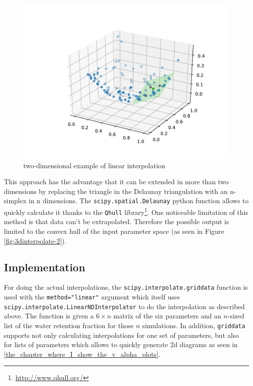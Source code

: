 \begin{figure}[h]
\end{figure}

\begin{figure}[h] %
	\centering
	\includegraphics[width=0.8\linewidth]{images/vis2d3.pdf}
	\caption{two-dimensional example of linear interpolation}
	\label{fig:3dinterpolate-3}
\end{figure}

This approach has the advantage that it can be extended in more than two dimensions by replacing the triangle in the Delaunay triangulation with an n-simplex in n dimensions. The \texttt{scipy.spatial.Delaunay} python function allows to quickly calculate it thanks to the \texttt{Qhull} library\footnote{\url{http://www.qhull.org/}}. One noticeable limitation of this method is that data can't be extrapolated. Therefore the possible output is limited to the convex hull of the input parameter space (as seen in Figure \ref{fig:3dinterpolate-2}).

\subsection{Implementation}
\label{sec:griddata-implementation}
For doing the actual interpolations, the \texttt{scipy.interpolate.griddata} function is used with the \texttt{method="linear"} argument which itself uses \texttt{scipy.interpolate.LinearNDInterpolator} to do the interpolation as described above. The function is given a $6\times n$ matrix of the six parameters and an $n$-sized list of the water retention fraction for those $n$ simulations. In addition, \texttt{griddata} supports not only calculating interpolations for one set of parameters, but also for lists of parameters which allows to quickly generate 2d diagrams as seen in \ref{the_chapter_where_I_show_the_v_alpha_plots}.

